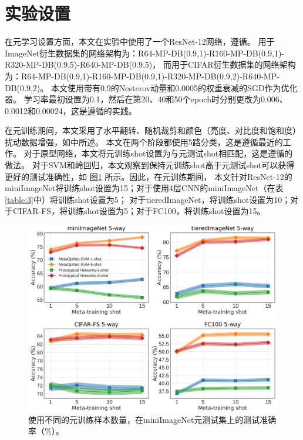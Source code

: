 \section{实验设置}
在元学习设置方面，本文在实验中使用了一个ResNet-12网络，遵循。
用于ImageNet衍生数据集的网络架构为：R64-MP-DB(0.9,1)-R160-MP-DB(0.9,1)-R320-MP-DB(0.9,5)-R640-MP-DB(0.9,5)，
而用于CIFAR衍生数据集的网络架构为：R64-MP-DB(0.9,1)-R160-MP-DB(0.9,1)-R320-MP-DB(0.9,2)-R640-MP-DB(0.9,2)。
本文使用带有0.9的Nesterov动量和0.0005的权重衰减的SGD作为优化器。
学习率最初设置为0.1，然后在第20、40和50个epoch时分别更改为0.006、0.0012和0.00024，这是遵循的实践。

在元训练期间，本文采用了水平翻转、随机裁剪和颜色（亮度、对比度和饱和度）扰动数据增强，如中所述。
本文在两个阶段都使用5路分类，这是遵循最近的工作。
对于原型网络，本文将元训练shot设置为与元测试shot相匹配，这是遵循的做法。
对于SVM和岭回归，本文观察到保持元训练shot高于元测试shot可以获得更好的测试准确性，如 图\ref{fig:2} 所示。因此，在元训练期间，
本文针对ResNet-12的miniImageNet将训练shot设置为15；对于使用4层CNN的miniImageNet（在表\ref{table:3}中）将训练shot设置为5；
对于tieredImageNet，将训练shot设置为10；对于CIFAR-FS，将训练shot设置为5；对于FC100，将训练shot设置为15。

\begin{figure}[htbp]
    \centering
    \includegraphics[width=.6\linewidth]{figure/f2.png}
    \caption{使用不同的元训练样本数量，在miniImageNet元测试集上的测试准确率（\%）。}
    \label{fig:2}
\end{figure}

